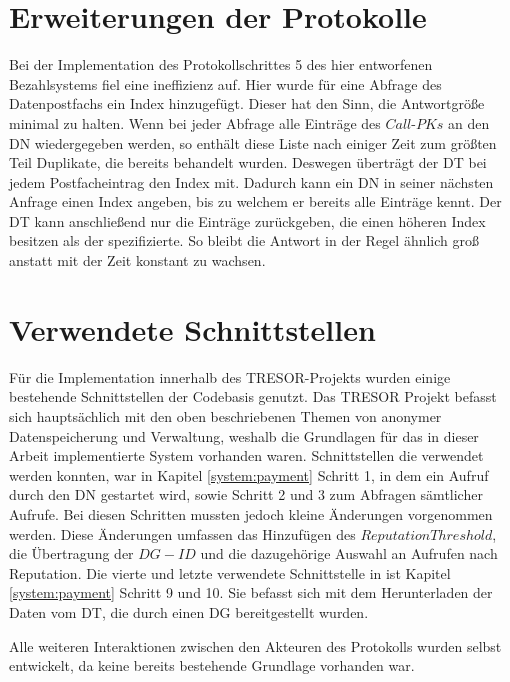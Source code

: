 \documentclass[
	fontsize=11pt,
	headings=small,
	parskip=half,           %
	bibliography=totoc,
	numbers=noenddot,       %
	open=any,               %
]{scrreprt}
\begin{document}
\section{Erweiterungen der Protokolle}
Bei der Implementation des Protokollschrittes 5 des hier entworfenen Bezahlsystems fiel eine ineffizienz auf. Hier wurde für eine Abfrage des Datenpostfachs ein Index hinzugefügt. Dieser hat den Sinn, die Antwortgröße minimal zu halten. Wenn bei jeder Abfrage alle Einträge des $Call$-$PKs$ an den DN wiedergegeben werden, so enthält diese Liste nach einiger Zeit zum größten Teil Duplikate, die bereits behandelt wurden. Deswegen überträgt der DT bei jedem Postfacheintrag den Index mit. Dadurch kann ein DN in seiner nächsten Anfrage einen Index angeben, bis zu welchem er bereits alle Einträge kennt. Der DT kann anschließend nur die Einträge zurückgeben, die einen höheren Index besitzen als der spezifizierte. So bleibt die Antwort in der Regel ähnlich groß anstatt mit der Zeit konstant zu wachsen.

\section{Verwendete Schnittstellen}
Für die Implementation innerhalb des TRESOR-Projekts wurden einige bestehende Schnittstellen der Codebasis genutzt. Das TRESOR Projekt befasst sich hauptsächlich mit den oben beschriebenen Themen von anonymer Datenspeicherung und Verwaltung, weshalb die Grundlagen für das in dieser Arbeit implementierte System vorhanden waren. Schnittstellen die verwendet werden konnten, war in Kapitel \ref{system:payment} Schritt 1, in dem ein Aufruf durch den DN gestartet wird, sowie Schritt 2 und 3 zum Abfragen sämtlicher Aufrufe. Bei diesen Schritten mussten jedoch kleine Änderungen vorgenommen werden. Diese Änderungen umfassen das Hinzufügen des $ReputationThreshold$, die Übertragung der $DG-ID$ und die dazugehörige Auswahl an Aufrufen nach Reputation. Die vierte und letzte verwendete Schnittstelle in ist Kapitel \ref{system:payment} Schritt 9 und 10. Sie befasst sich mit dem Herunterladen der Daten vom DT, die durch einen DG bereitgestellt wurden. 

Alle weiteren Interaktionen zwischen den Akteuren des Protokolls wurden selbst entwickelt, da keine bereits bestehende Grundlage vorhanden war. 
\end{document}
